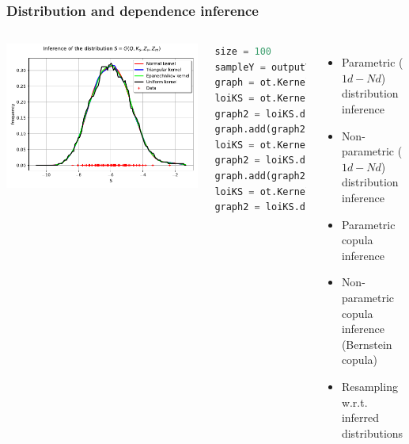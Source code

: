 \documentclass{beamer}
\begin{document}

\begin{frame}[containsverbatim]
\frametitle{Distribution and dependence inference}

\scriptsize{

\begin{columns}

    \includegraphics[width=.8\textwidth]{figures/Inference.pdf}


  
    

\scriptsize 
\begin{lstlisting}[language=Python, numbers = none]
size = 100
sampleY = outputVector.getSample(size)
graph = ot.KernelSmoothing(ot.Normal()).build(sampleY).drawPDF()
loiKS = ot.KernelSmoothing(ot.Triangular()).build(sampleY)
graph2 = loiKS.drawPDF()
graph.add(graph2)
loiKS = ot.KernelSmoothing(ot.Epanechnikov()).build(sampleY)
graph2 = loiKS.drawPDF()
graph.add(graph2)
loiKS = ot.KernelSmoothing(ot.Uniform()).build(sampleY)
graph2 = loiKS.drawPDF()

\end{lstlisting}

	  \begin{itemize}
  \item Parametric ($1d - Nd$) distribution inference
  \item Non-parametric ($1d - Nd$) distribution inference
  \item Parametric copula inference
  \item Non-parametric copula inference (Bernstein copula)
  \item Resampling w.r.t. inferred distributions
  \end{itemize}
  
\end{columns}


}


\end{frame}
\end{document}

